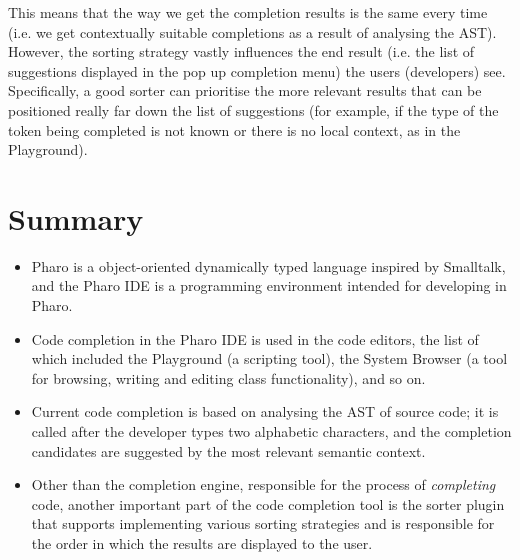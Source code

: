 This means that the way we get the completion results is the same every time (i.e. we get contextually suitable completions as a result of analysing the AST). However, the sorting strategy vastly influences the end result (i.e. the list of suggestions displayed in the pop up completion menu) the users (developers) see. Specifically, a good sorter can prioritise the more relevant results that can be positioned really far down the list of suggestions (for example, if the type of the token being completed is not known or there is no local context, as in the Playground).

\section{Summary}
\label{sec:PharoCompletion-Summary}
\begin{itemize}
    \item Pharo is a object-oriented dynamically typed language inspired by Smalltalk, and the Pharo IDE is a programming environment intended for developing in Pharo.
    \item Code completion in the Pharo IDE is used in the code editors, the list of which included the Playground (a scripting tool), the System Browser (a tool for browsing, writing and editing class functionality), and so on.
    \item Current code completion is based on analysing the AST of source code; it is called after the developer types two alphabetic characters, and the completion candidates are suggested by the most relevant semantic context.
    \item Other than the completion engine, responsible for the process of \textit{completing} code, another important part of the code completion tool is the sorter plugin that supports implementing various sorting strategies and is responsible for the order in which the results are displayed to the user.
\end{itemize}